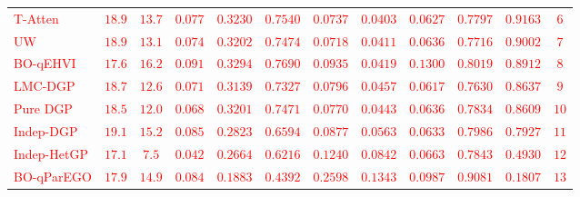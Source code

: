 \documentclass[11pt]{article}
\begin{document}
\begin{table}[!htbp]
{\begin{tabular}{lccccccccccc}
		\textcolor{red}{T-Atten} & \textcolor{red}{$18.9$} & \textcolor{red}{$13.7$} & \textcolor{red}{$0.077$} & \textcolor{red}{$0.3230$} & \textcolor{red}{$0.7540$} & \textcolor{red}{$0.0737$} & \textcolor{red}{$0.0403$} & \textcolor{red}{$0.0627$} & \textcolor{red}{$0.7797$} & \textcolor{red}{$0.9163$} & \textcolor{red}{$6$}\\%
		\textcolor{red}{UW}             & \textcolor{red}{$18.9$} & \textcolor{red}{$13.1$} & \textcolor{red}{$0.074$} & \textcolor{red}{$0.3202$} & \textcolor{red}{$0.7474$} & \textcolor{red}{$0.0718$} & \textcolor{red}{$0.0411$} & \textcolor{red}{$0.0636$} & \textcolor{red}{$0.7716$} & \textcolor{red}{$0.9002$} & \textcolor{red}{$7$}\\%
		\textcolor{red}{BO-qEHVI} & \textcolor{red}{$17.6$} & \textcolor{red}{$16.2$} & \textcolor{red}{$0.091$} & \textcolor{red}{$0.3294$} & \textcolor{red}{$0.7690$} & \textcolor{red}{$0.0935$} & \textcolor{red}{$0.0419$} & \textcolor{red}{$0.1300$} & \textcolor{red}{$0.8019$} & \textcolor{red}{$0.8912$} & \textcolor{red}{$8$}\\%
		\textcolor{red}{LMC-DGP}        & \textcolor{red}{$18.7$} & \textcolor{red}{$12.6$} & \textcolor{red}{$0.071$} & \textcolor{red}{$0.3139$} & \textcolor{red}{$0.7327$} & \textcolor{red}{$0.0796$} & \textcolor{red}{$0.0457$} & \textcolor{red}{$0.0617$} & \textcolor{red}{$0.7630$} & \textcolor{red}{$0.8637$} & \textcolor{red}{$9$}\\%
		\textcolor{red}{Pure DGP}       & \textcolor{red}{$18.5$} & \textcolor{red}{$12.0$} & \textcolor{red}{$0.068$} & \textcolor{red}{$0.3201$} & \textcolor{red}{$0.7471$} & \textcolor{red}{$0.0770$} & \textcolor{red}{$0.0443$} & \textcolor{red}{$0.0636$} & \textcolor{red}{$0.7834$} & \textcolor{red}{$0.8609$} & \textcolor{red}{$10$}\\%
		\textcolor{red}{Indep-DGP}      & \textcolor{red}{$19.1$} & \textcolor{red}{$15.2$} & \textcolor{red}{$0.085$} & \textcolor{red}{$0.2823$} & \textcolor{red}{$0.6594$} & \textcolor{red}{$0.0877$} & \textcolor{red}{$0.0563$} & \textcolor{red}{$0.0633$} & \textcolor{red}{$0.7986$} & \textcolor{red}{$0.7927$} & \textcolor{red}{$11$}\\%
		\textcolor{red}{Indep-HetGP}    & \textcolor{red}{$17.1$} & \textcolor{red}{$7.5$} & \textcolor{red}{$0.042$} & \textcolor{red}{$0.2664$} & \textcolor{red}{$0.6216$} & \textcolor{red}{$0.1240$} & \textcolor{red}{$0.0842$} & \textcolor{red}{$0.0663$} & \textcolor{red}{$0.7843$} & \textcolor{red}{$0.4930$} & \textcolor{red}{$12$}\\%
		\textcolor{red}{BO-qParEGO}     & \textcolor{red}{$17.9$} & \textcolor{red}{$14.9$} & \textcolor{red}{$0.084$} & \textcolor{red}{$0.1883$} & \textcolor{red}{$0.4392$} & \textcolor{red}{$0.2598$} & \textcolor{red}{$0.1343$} & \textcolor{red}{$0.0987$} & \textcolor{red}{$0.9081$} & \textcolor{red}{$0.1807$} & \textcolor{red}{$13$}\\%
		\bottomrule
	\end{tabular}}
\end{table}
\end{document}
